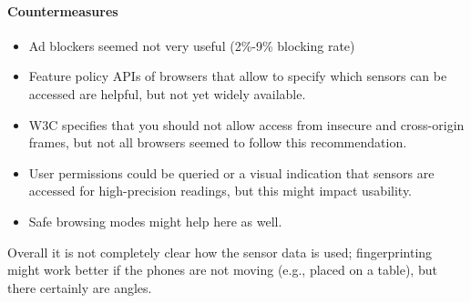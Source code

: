 \documentclass{article}
\begin{document}
\paragraph{Countermeasures}
\begin{itemize}
	\item Ad blockers seemed not very useful (2\%-9\% blocking rate)
	\item Feature policy APIs of browsers that allow to specify which sensors can be accessed are helpful, but not yet widely available.
	\item W3C specifies that you should not allow access from insecure and cross-origin frames, but not all browsers seemed to follow this recommendation.
	\item User permissions could be queried or a visual indication that sensors are accessed for high-precision readings, but this might impact usability.
	\item Safe browsing modes might help here as well.
\end{itemize}

Overall it is not completely clear how the sensor data is used; fingerprinting might work better if the phones are not moving (e.g., placed on a table), but there certainly are angles.







\end{document}
